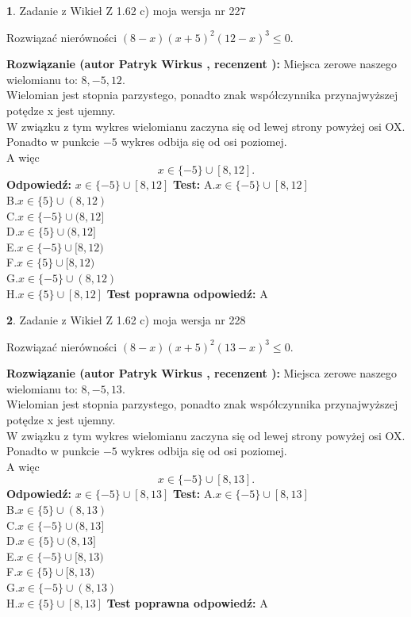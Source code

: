 \documentclass[12pt, a4paper]{article}
\theoremstyle{definition} %
\newtheorem{zad}{}
\newcommand{\zadStart}[1]{\begin{zad}#1\newline}
\newcommand{\zadStop}{\end{zad}}
\newcommand{\rozwStart}[2]{\noindent \textbf{Rozwiązanie (autor #1 , recenzent #2): }\newline}
\newcommand{\rozwStop}{\newline}
\newcommand{\odpStart}{\noindent \textbf{Odpowiedź:}\newline}
\newcommand{\odpStop}{\newline}
\newcommand{\testStart}{\noindent \textbf{Test:}\newline}
\newcommand{\testStop}{\newline}
\newcommand{\kluczStart}{\noindent \textbf{Test poprawna odpowiedź:}\newline}
\newcommand{\kluczStop}{\newline}
\begin{document}
\zadStart{Zadanie z Wikieł Z 1.62 c) moja wersja nr 227}

Rozwiązać nierówności $(8-x)(x+5)^{2}(12-x)^{3}\le0$.
\zadStop
\rozwStart{Patryk Wirkus}{}
Miejsca zerowe naszego wielomianu to: $8, -5, 12$.\\
Wielomian jest stopnia parzystego, ponadto znak współczynnika przy\linebreak najwyższej potędze x jest ujemny.\\ W związku z tym wykres wielomianu zaczyna się od lewej strony powyżej osi OX.\\
Ponadto w punkcie $-5$ wykres odbija się od osi poziomej.\\
A więc $$x \in \{-5\} \cup [8,12].$$
\rozwStop
\odpStart
$x \in \{-5\} \cup [8,12]$
\odpStop
\testStart
A.$x \in \{-5\} \cup [8,12]$\\
B.$x \in \{5\} \cup (8,12)$\\
C.$x \in \{-5\} \cup (8,12]$\\
D.$x \in \{5\} \cup (8,12]$\\
E.$x \in \{-5\} \cup [8,12)$\\
F.$x \in \{5\} \cup [8,12)$\\
G.$x \in \{-5\} \cup (8,12)$\\
H.$x \in \{5\} \cup [8,12]$
\testStop
\kluczStart
A
\kluczStop



\zadStart{Zadanie z Wikieł Z 1.62 c) moja wersja nr 228}

Rozwiązać nierówności $(8-x)(x+5)^{2}(13-x)^{3}\le0$.
\zadStop
\rozwStart{Patryk Wirkus}{}
Miejsca zerowe naszego wielomianu to: $8, -5, 13$.\\
Wielomian jest stopnia parzystego, ponadto znak współczynnika przy\linebreak najwyższej potędze x jest ujemny.\\ W związku z tym wykres wielomianu zaczyna się od lewej strony powyżej osi OX.\\
Ponadto w punkcie $-5$ wykres odbija się od osi poziomej.\\
A więc $$x \in \{-5\} \cup [8,13].$$
\rozwStop
\odpStart
$x \in \{-5\} \cup [8,13]$
\odpStop
\testStart
A.$x \in \{-5\} \cup [8,13]$\\
B.$x \in \{5\} \cup (8,13)$\\
C.$x \in \{-5\} \cup (8,13]$\\
D.$x \in \{5\} \cup (8,13]$\\
E.$x \in \{-5\} \cup [8,13)$\\
F.$x \in \{5\} \cup [8,13)$\\
G.$x \in \{-5\} \cup (8,13)$\\
H.$x \in \{5\} \cup [8,13]$
\testStop
\kluczStart
A
\kluczStop
\end{document}
